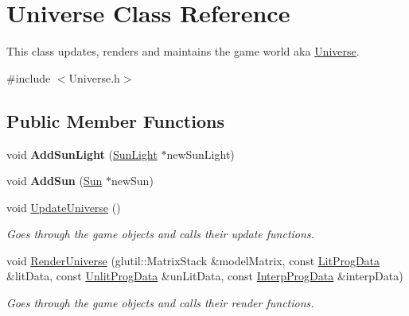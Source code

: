 \hypertarget{class_universe}{\section{Universe Class Reference}
\label{class_universe}
}


This class updates, renders and maintains the game world aka \hyperlink{class_universe}{Universe}.  




{\ttfamily \#include $<$Universe.\-h$>$}

\subsection*{Public Member Functions}
\begin{DoxyCompactItemize}
\item 
\hypertarget{class_universe_ade4f13031aff9dbf5c8867334a525a01}{void {\bfseries Add\-Sun\-Light} (\hyperlink{class_sun_light}{Sun\-Light} $\ast$new\-Sun\-Light)}\label{class_universe_ade4f13031aff9dbf5c8867334a525a01}

\item 
\hypertarget{class_universe_a6c01c73614710200f25ece9d4444a10d}{void {\bfseries Add\-Sun} (\hyperlink{class_sun}{Sun} $\ast$new\-Sun)}\label{class_universe_a6c01c73614710200f25ece9d4444a10d}

\item 
\hypertarget{class_universe_acae0ef79d1350457b3824a19134f8a3d}{void \hyperlink{class_universe_acae0ef79d1350457b3824a19134f8a3d}{Update\-Universe} ()}\label{class_universe_acae0ef79d1350457b3824a19134f8a3d}

\begin{DoxyCompactList}\small\item\em Goes through the game objects and calls their update functions. \end{DoxyCompactList}\item 
\hypertarget{class_universe_ace045abe0b7adb4c1ba7c33c69a2bd07}{void \hyperlink{class_universe_ace045abe0b7adb4c1ba7c33c69a2bd07}{Render\-Universe} (glutil\-::\-Matrix\-Stack \&model\-Matrix, const \hyperlink{struct_lit_prog_data}{Lit\-Prog\-Data} \&lit\-Data, const \hyperlink{struct_unlit_prog_data}{Unlit\-Prog\-Data} \&un\-Lit\-Data, const \hyperlink{struct_interp_prog_data}{Interp\-Prog\-Data} \&interp\-Data)}\label{class_universe_ace045abe0b7adb4c1ba7c33c69a2bd07}

\begin{DoxyCompactList}\small\item\em Goes through the game objects and calls their render functions. \end{DoxyCompactList}\end{DoxyCompactItemize}
